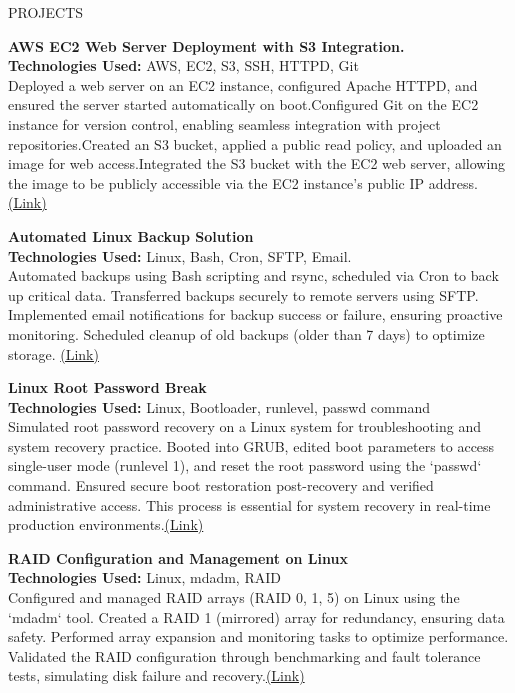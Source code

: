 \documentclass{resume} %
\begin{document}
\begin{rSection}{PROJECTS}
\vspace{-1.25em}
\item \textbf{AWS EC2 Web Server Deployment with S3 Integration.} \\
{{\bf Technologies Used:}{ AWS, EC2, S3, SSH, HTTPD, Git}}\\
{Deployed a web server on an EC2 instance, configured Apache HTTPD, and ensured the server started automatically on boot.Configured Git on the EC2 instance for version control, enabling seamless integration with project repositories.Created an S3 bucket, applied a public read policy, and uploaded an image for web access.Integrated the S3 bucket with the EC2 web server, allowing the image to be publicly accessible via the EC2 instance's public IP address.
\href{https://github.com/Kaustubh-jadhav/DevOps-project-1}{(Link)}}
\item \textbf{Automated Linux Backup Solution}\\
{{\bf Technologies Used:}{ Linux, Bash, Cron, SFTP, Email.}}\\
{Automated backups using Bash scripting and rsync, scheduled via Cron to back up critical data.
Transferred backups securely to remote servers using SFTP.
Implemented email notifications for backup success or failure, ensuring proactive monitoring.
Scheduled cleanup of old backups (older than 7 days) to optimize storage.}
\href{https://github.com/Kaustubh-jadhav/linux-backup}{(Link)}

\vspace{+1.25em}
\item \textbf{Linux Root Password Break} \\
{{\bf Technologies Used:}{ Linux, Bootloader, runlevel, passwd command}}\\
Simulated root password recovery on a Linux system for troubleshooting and system recovery practice. Booted into GRUB, edited boot parameters to access single-user mode (runlevel 1), and reset the root password using the `passwd` command. Ensured secure boot restoration post-recovery and verified administrative access. This process is essential for system recovery in real-time production environments.\href{https://www.linkedin.com/posts/kaus-jadhv_linux-sysadmin-rootpasswordreset-activity-7312016535932276736-cfrn?utm_source=share&utm_medium=member_desktop&rcm=ACoAAD-7XngBbLbTjoeEp0tFET_oEX7qz4uMZUk}{(Link)}

\item \textbf{RAID Configuration and Management on Linux} \\
{{\bf Technologies Used:}{ Linux, mdadm, RAID}}\\
Configured and managed RAID arrays (RAID 0, 1, 5) on Linux using the `mdadm` tool. Created a RAID 1 (mirrored) array for redundancy, ensuring data safety. Performed array expansion and monitoring tasks to optimize performance. Validated the RAID configuration through benchmarking and fault tolerance tests, simulating disk failure and recovery.\href{https://www.linkedin.com/posts/kaus-jadhv_rockylinux-linuxadmin-raidsetup-activity-7317132883511459840-BXFp?utm_source=share&utm_medium=member_desktop&rcm=ACoAAD-7XngBbLbTjoeEp0tFET_oEX7qz4uMZUk}{(Link)}



\end{rSection}
\end{document}
